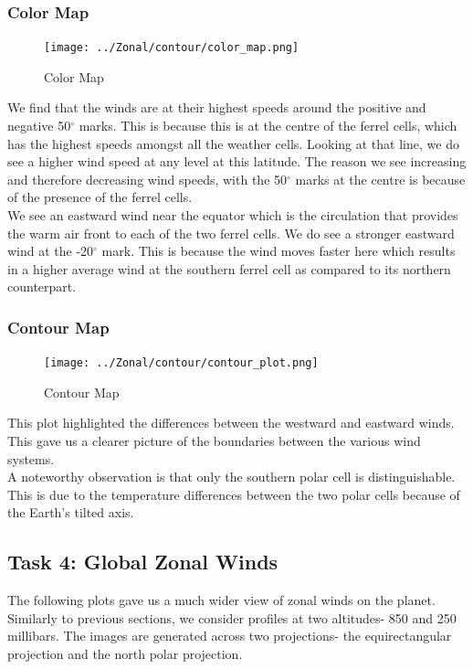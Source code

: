 \documentclass[hidelinks]{article}
\begin{document}
\subsubsection{Color Map}
\begin{figure}[h!]
	\centering
	\texttt{[image: ../Zonal/contour/color\_map.png]}
	\caption{Color Map}
\end{figure}
\noindent We find that the winds are at their highest speeds around the positive and negative 50$^\circ$ marks. This is because this is at the centre of the ferrel cells, which has the highest speeds amongst all the weather cells. Looking at that line, we do see a higher wind speed at any level at this latitude. The reason we see increasing and therefore decreasing wind speeds, with the 50$^\circ$ marks at the centre is because of the presence of the ferrel cells.\\We see an eastward wind near the equator which is the circulation that provides the warm air front to each of the two ferrel cells. We do see a stronger eastward wind at the -20$^\circ$ mark. This is because the wind moves faster here which results in a higher average wind at the southern ferrel cell as compared to its northern counterpart.
\subsubsection{Contour Map}
\begin{figure}[h!]
	\centering
	\texttt{[image: ../Zonal/contour/contour\_plot.png]}
	\caption{Contour Map}
\end{figure}
\noindent This plot highlighted the differences between the westward and eastward winds. This gave us a clearer picture of the boundaries between the various wind systems. \\A noteworthy observation is that only the southern polar cell is distinguishable. This is due to the temperature differences between the two polar cells because of the Earth's tilted axis.
\newpage
\subsection{Task 4: Global Zonal Winds}
The following plots gave us a much wider view of zonal winds on the planet. Similarly to previous sections, we consider profiles at two altitudes- 850 and 250 millibars. The images are generated across two projections- the equirectangular projection and the north polar projection.
\end{document}
